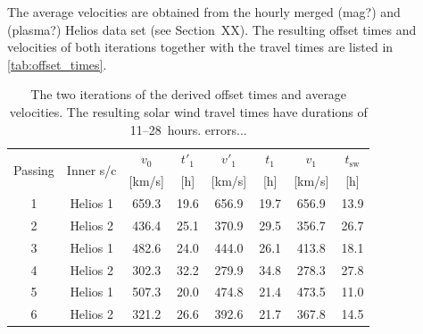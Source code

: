 The average velocities are obtained from the hourly merged (mag?) and (plasma?) Helios data set (see Section~XX). The resulting offset times and velocities of both iterations together with the travel times are listed in \autoref{tab:offset_times}.
\begin{table}[htb]\small
	\centering
	\captionsetup{belowskip=4pt}
	\caption{The two iterations of the derived offset times and average velocities. The resulting solar wind travel times have durations of 11--28~hours. errors...}
	\begin{tabular}{cccccccc}
		\toprule
		\multirow{2}{*}{Passing}	&\multirow{2}{*}{Inner s/c}	&$v_0$	&$t'_1$	&$v'_1$	&$t_1$	&$v_1$	&$t_\text{sw}$\\
			&	&[km/s]	&[h]	&[km/s]	&[h]	&[km/s]	&[h]\\
		\midrule
		1	&Helios 1	&659.3	&19.6	&656.9	&19.7	&656.9	&13.9\\
		2	&Helios 2	&436.4	&25.1	&370.9	&29.5	&356.7	&26.7\\
		3	&Helios 1	&482.6	&24.0	&444.0	&26.1	&413.8	&18.1\\
		4	&Helios 2	&302.3	&32.2	&279.9	&34.8	&278.3	&27.8\\
		5	&Helios 1	&507.3	&20.0	&474.8	&21.4	&473.5	&11.0\\
		6	&Helios 2	&321.2	&26.6	&392.6	&21.7	&367.8	&14.5\\
		\bottomrule
	\end{tabular}
	\label{tab:offset_times}
\end{table}

